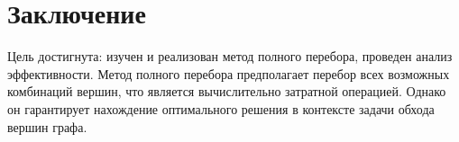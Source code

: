 \documentclass[12pt, a4paper]{article}
\begin{document}
\section*{Заключение}
Цель достигнута: изучен и реализован метод полного перебора, 
проведен анализ эффективности. Метод полного перебора предполагает 
перебор всех возможных комбинаций вершин, что является 
вычислительно затратной операцией. Однако он гарантирует 
нахождение оптимального решения в контексте задачи обхода вершин 
графа.
\end{document}
